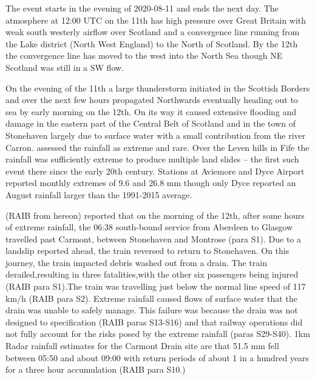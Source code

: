 \documentclass[11pt,a4paper]{article}
\begin{document}
  The event starts in the evening of 2020-08-11 and ends the next day. The atmosphere  at 12:00 UTC on the 11th has high pressure over Great Britain with weak south westerly airflow over Scotland and a convergence line running from the Lake district (North West England) to the North of Scotland\parencite{pritchard2020weather}. By the 12th the convergence line has moved to the west into the North Sea though NE Scotland was still in a SW flow. 

On  the evening of the 11th  a large thunderstorm initiated in the Scottish Borders and over the next few hours propagated Northwards eventually heading out to sea by early morning on the 12th\parencite{Kendon2020thunderstrorms_report}. On its way it caused extensive flooding and damage in the eastern part of the Central Belt of Scotland\parencite{SEPA2020report_floods} and in the town of Stonehaven largely due to surface water with a small contribution from the river Carron. \cite{SEPA2020report_floods} assessed the rainfall as  extreme and rare. Over the Leven hills in Fife the rainfall was sufficiently extreme to produce multiple land slides -- the first such event there since the early 20th century\parencite{Kirkbride2021}.  Stations at Aviemore and Dyce Airport\parencite{pritchard2020weather} reported monthly extremes of 9.6 and 26.8 mm though only Dyce reported an August rainfall larger than the 1991-2015 average. 



\cite{carmontReport2024} (RAIB from hereon) reported that on the morning of the 12th, after some hours of extreme rainfall, the 06:38 south-bound service from Aberdeen to Glasgow travelled past Carmont, between Stonehaven and Montrose (para S1). Due to a landslip reported ahead, the train reversed to return to Stonehaven. On this journey, the train impacted debris washed out from a drain. The train derailed,resulting in three fatalities,with the other six passengers being injured (RAIB para S1).The train was travelling just below the normal line speed of 117 km/h (RAIB para S2). Extreme rainfall caused flows of surface water that the drain was unable to safely manage. This failure was because the drain was not designed to specification (RAIB paras S13-S16) and that railway operations did not fully account for the risks posed by the extreme rainfall (paras S29-S40). 1km Radar rainfall estimates for the Carmont Drain site are that 51.5 mm fell between 05:50 and about 09:00 with return periods of about 1 in a hundred years for a three hour accumulation (RAIB para S10.)
\end{document}
